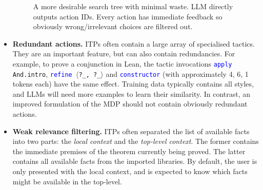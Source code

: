 \documentclass[twoside]{report}
\begin{document}
\begin{itemize}
\begin{figure}[ht]
    \caption{A more desirable search tree with minimal waste. LLM directly outputs action IDs. Every action has immediate feedback so obviously wrong/irrelevant choices are filtered out.}
    \label{fig:search_tree_improved}
    \end{figure}
    
    \item \textbf{Redundant actions.} ITPs often contain a large array of specialised tactics. They are an important feature, but can also contain redundancies. For example, to prove a conjunction in Lean, the tactic invocations \texttt{\textcolor{blue}{apply} And.intro}, \texttt{\textcolor{blue}{refine} $\langle$?\_, ?\_$\rangle$} and \texttt{\textcolor{blue}{constructor}} (with approximately 4, 6, 1 tokens each) have the same effect. Training data typically contains all styles, and LLMs will need more examples to learn their similarity. In contrast, an improved formulation of the MDP should not contain obviously redundant actions.
    
    \item \textbf{Weak relevance filtering.} ITPs often separated the list of available facts into two parts: the \emph{local context} and the \emph{top-level context}. The former contains the immediate premises of the theorem currently being proved. The latter contains all available facts from the imported libraries. By default, the user is only presented with the local context, and is expected to know which facts might be available in the top-level.
    

\end{itemize}
\end{document}
